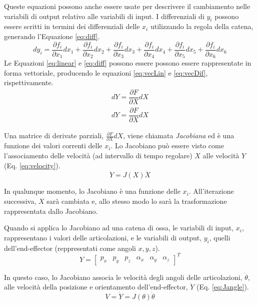 Queste equazioni possono anche essere usate per descrivere il cambiamento nelle variabili di output relativo alle variabili di input.
I differenziali di $y_i$ possono essere scritti in termini dei differenziali delle $x_i$ utilizzando la regola della catena, generando l'Equazione \ref{eq:diff}.
\begin{equation}\label{eq:diff}
    dy_i = \dfrac{\partial f_i}{\partial x_1}dx_1+
        \dfrac{\partial f_i}{\partial x_2}dx_2+
        \dfrac{\partial f_i}{\partial x_3}dx_3+
        \dfrac{\partial f_i}{\partial x_4}dx_4+
        \dfrac{\partial f_i}{\partial x_5}dx_5+
        \dfrac{\partial f_i}{\partial x_6}dx_6
\end{equation}
Le Equazioni \ref{eq:linear} e \ref{eq:diff} possono essere possono essere rappresentate in forma vettoriale, producendo le equazioni \ref{eq:vecLin} e \ref{eq:vecDif}, rispettivamente.
\begin{align}
    \label{eq:vecLin}
    dY =  \dfrac{\partial F}{\partial X}dX\\[5ex]
    \label{eq:vecDif}
    dY =  \dfrac{\partial F}{\partial X}dX
\end{align}

Una matrice di derivate parziali, $\frac{\partial F}{\partial X}dX$, viene chiamata \emph{Jacobiana} ed è una funzione dei valori correnti delle $x_i$. Lo Jacobiano può essere visto come l'associamento delle velocità (ad intervallo di tempo regolare) $X$ alle velocità $Y$ (Eq. \ref{eq:velocity}).
\begin{equation}\label{eq:velocity}
    \dot{Y} = J(X)\dot{X}
\end{equation}

In qualunque momento, lo Jacobiano è una funzione delle $x_i$. All'iterazione successiva, $X$ sarà cambiata e, allo stesso modo lo sarà la trasformazione rappresentata dallo Jacobiano.

Quando si applica lo Jacobiano ad una catena di ossa, le variabili di input, $x_i$, rappresentano i valori delle articolazioni, e le variabili di output, $y_i$, quelli dell'end-effector (reppresentati come angoli $x,y,z$).
\begin{equation}
    Y=
    \begin{bmatrix}
        p_x & p_y & p_z & \alpha_x & \alpha_y & \alpha_z
    \end{bmatrix}
    ^T    
\end{equation}

In questo caso, lo Jacobiano associa le velocità degli angoli delle articolazioni, $\dot{\theta}$, alle velocità della posizione e orientamento dell'end-effector, $\dot{Y}$ (Eq. \ref{eq:Jangle}).
\begin{equation}\label{eq:Jangle}
    V = \dot{Y} = J(\theta)\dot{\theta}
\end{equation}

